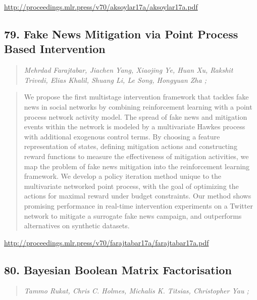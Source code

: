 \documentclass{article}
\begin{document}
\href{http://proceedings.mlr.press/v70/aksoylar17a/aksoylar17a.pdf}{http://proceedings.mlr.press/v70/aksoylar17a/aksoylar17a.pdf}

\subsection{79. Fake News Mitigation via Point Process Based Intervention}

\begin{quote}
\footnotesize{\textit{Mehrdad Farajtabar, Jiachen Yang, Xiaojing Ye, Huan Xu, Rakshit Trivedi, Elias Khalil, Shuang Li, Le Song, Hongyuan Zha ;}}

\end{quote}

\begin{quote}
    We propose the first multistage intervention framework that tackles fake news in social networks by combining reinforcement learning with a point process network activity model. The spread of fake news and mitigation events within the network is modeled by a multivariate Hawkes process with additional exogenous control terms. By choosing a feature representation of states, defining mitigation actions and constructing reward functions to measure the effectiveness of mitigation activities, we map the problem of fake news mitigation into the reinforcement learning framework. We develop a policy iteration method unique to the multivariate networked point process, with the goal of optimizing the actions for maximal reward under budget constraints. Our method shows promising performance in real-time intervention experiments on a Twitter network to mitigate a surrogate fake news campaign, and outperforms alternatives on synthetic datasets.  
\end{quote}

\href{http://proceedings.mlr.press/v70/farajtabar17a/farajtabar17a.pdf}{http://proceedings.mlr.press/v70/farajtabar17a/farajtabar17a.pdf}

\subsection{80. Bayesian Boolean Matrix Factorisation}

\begin{quote}
\footnotesize{\textit{Tammo Rukat, Chris C. Holmes, Michalis K. Titsias, Christopher Yau ;}}

\end{quote}
\end{document}
